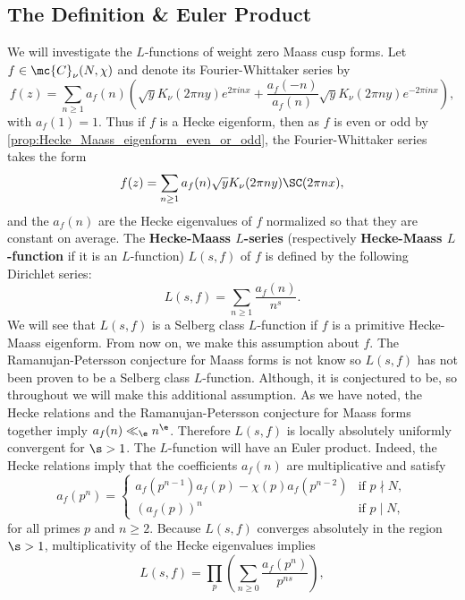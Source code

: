     \subsection*{The Definition \& Euler Product}
      We will investigate the $L$-functions of weight zero Maass cusp forms. Let $f \in \mc{C}_{\nu}(N,\chi)$ and denote its Fourier-Whittaker series by
      \[
        f(z) = \sum_{n \ge 1}a_{f}(n)\left(\sqrt{y}K_{\nu}(2\pi ny)e^{2\pi inx}+\frac{a_{f}(-n)}{a_{f}(n)}\sqrt{y}K_{\nu}(2\pi ny)e^{-2\pi inx}\right),
      \]
      with $a_{f}(1) = 1$. Thus if $f$ is a Hecke eigenform, then as $f$ is even or odd by \cref{prop:Hecke_Maass_eigenform_even_or_odd}, the Fourier-Whittaker series takes the form
      \[
        f(z) = \sum_{n \ge 1}a_{f}(n)\sqrt{y}K_{\nu}(2\pi ny)\SC(2\pi nx),
      \]
      and the $a_{f}(n)$ are the Hecke eigenvalues of $f$ normalized so that they are constant on average. The \textbf{Hecke-Maass $L$-series} (respectively \textbf{Hecke-Maass $L$-function} if it is an $L$-function) $L(s,f)$ of $f$ is defined by the following Dirichlet series:
      \[
        L(s,f) = \sum_{n \ge 1}\frac{a_{f}(n)}{n^{s}}.
      \]
      We will see that $L(s,f)$ is a Selberg class $L$-function if $f$ is a primitive Hecke-Maass eigenform. From now on, we make this assumption about $f$. The Ramanujan-Petersson conjecture for Maass forms is not know so $L(s,f)$ has not been proven to be a Selberg class $L$-function. Although, it is conjectured to be, so throughout we will make this additional assumption. As we have noted, the Hecke relations and the Ramanujan-Petersson conjecture for Maass forms together imply $a_{f}(n) \ll_{\e} n^{\e}$. Therefore $L(s,f)$ is locally absolutely uniformly convergent for $\s > 1$. The $L$-function will have an Euler product. Indeed, the Hecke relations imply that the coefficients $a_{f}(n)$ are multiplicative and satisfy
      \begin{equation}\label{equ:primitive_Hecke_eigenform_recurrence_for_coefficients_of_Maass_L-function}
        a_{f}(p^{n}) = \begin{cases} a_{f}(p^{n-1})a_{f}(p)-\chi(p)a_{f}(p^{n-2}) & \text{if $p \nmid N$}, \\ (a_{f}(p))^{n} & \text{if $p \mid N$}, \end{cases}
      \end{equation}
      for all primes $p$ and $n \ge 2$. Because $L(s,f)$ converges absolutely in the region $\s > 1$, multiplicativity of the Hecke eigenvalues implies
      \[
        L(s,f) = \prod_{p}\left(\sum_{n \ge 0}\frac{a_{f}(p^{n})}{p^{ns}}\right),
      \]
